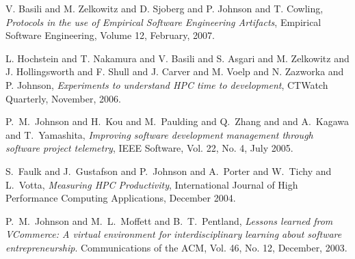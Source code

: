 \begin{Journal Publications}

\item V. Basili and M. Zelkowitz and D. Sjoberg and P. Johnson and T. Cowling,
{\em Protocols in the use of Empirical Software Engineering Artifacts}, 
Empirical Software Engineering, Volume 12, February, 2007.

\item L. Hochstein and T. Nakamura and V. Basili and S. Asgari and 
M. Zelkowitz and J. Hollingsworth and F. Shull and J. Carver and 
M. Voelp and N. Zazworka and P. Johnson, {\em Experiments to 
understand HPC time to development}, CTWatch Quarterly, 
November, 2006.

\item P.~M.~Johnson and H.~Kou and M.~Paulding and Q.~Zhang and
and A.~Kagawa and T.~Yamashita, {\em Improving software development
management through software project telemetry}, 
IEEE Software, Vol. 22, No. 4, July 2005.

\item S.~Faulk and J.~Gustafson and P.~Johnson and A.~Porter and W.~Tichy 
and L.~Votta, {\em Measuring {HPC} Productivity}, 
International Journal of High Performance Computing Applications, December 2004. 

\item P.~M.~Johnson and M.~L.~Moffett and B.~T.~Pentland, {\em
Lessons learned from VCommerce: A virtual
environment for interdisciplinary learning about software entrepreneurship}.
Communications of the ACM, Vol. 46, No. 12, December, 2003.


\end{Journal Publications}  

